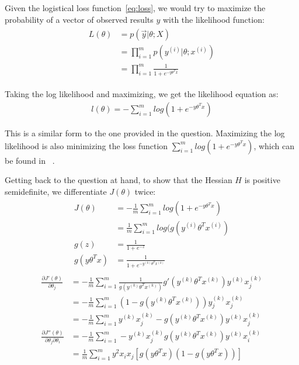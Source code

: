 \documentclass[11pt]{article}
\begin{document}
Given the logistical loss function~\ref{eq:loss}, we would try to maximize the 
probability of a vector of observed results $y$ with the likelihood function:
\begin{align}
		\begin{split}
				L(\theta) &= p(\vec{y}| \theta; X) \\
				&=\prod_{i=1}^{m}p(y^{(i)}|\theta;x^{(i)}) \\
				&=\prod_{i=1}^{m}\frac{1}{1+e^{-y\theta^Tx}}
		\end{split}
\end{align}

Taking the log likelihood and maximizing, we get the likelihood equation as:
\begin{align}
		l(\theta) = -\sum_{i=1}^{m}log(1+e^{-y\theta^Tx})
\end{align}

This is a similar form to the one provided in the question. Maximizing the log likelihood 
is also minimizing the loss function $\sum_{i=1}^{m}log(1+e^{-y\theta^Tx})$, which can be 
found in ~\cite{logisticloss}.

Getting back to the question at hand, to show that the Hessian $H$ is positive 
semidefinite, we differentiate $J(\theta)$ twice:
\begin{align}
		\begin{split}
			J(\theta) &= -\frac{1}{m}\sum_{i=1}^{m}log(1+e^{-y\theta^Tx}) \\
			          &= \frac{1}{m}\sum_{i=1}^{m}log(g(y^{(i)}\theta^Tx^{(i)}) \\ 
	         g(z) &= \frac{1}{1+e^{-z}} \\
  g(y\theta^Tx) &= \frac{1}{1+e^{-y^{(k)}\theta^Tx^{(k)}}}
		\end{split}
\end{align}
\begin{align}
		\begin{split}
		\frac{\partial J'(\theta)}{\partial \theta_j} &= -\frac{1}{m}\sum_{i=1}^{m}\frac{1}{g(y^{(k)}\theta^Tx^{(k)})}g'(y^{(k)}\theta^Tx^{(k)})y^{(k)}x^{(k)}_j \\
		&= -\frac{1}{m}\sum_{i=1}^{m}(1-g(y^{(k)}\theta^Tx^{(k)}))y^{(k)}_jx^{(k)}_j \\
		&= -\frac{1}{m}\sum_{i=1}^{m}y^{(k)}x^{(k)}_j-g(y^{(k)}\theta^Tx^{(k)})y^{(k)}x^{(k)}_j \\
		\frac{\partial J''(\theta)}{\partial \theta_j \partial \theta_i} &= -\frac{1}{m}\sum_{i=1}^{m}-y^{(k)}x^{(k)}_jg(y^{(k)}\theta^Tx^{(k)})y^{(k)}x^{(k)}_i \\
																		 &= \frac{1}{m}\sum_{i=1}^{m}y^2x_ix_j[g(y\theta^Tx)(1-g(y\theta^Tx))]
		\end{split}
\end{align}
\end{document}
